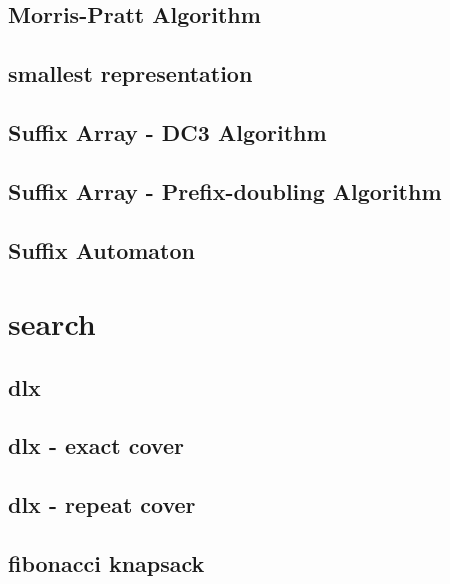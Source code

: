 \documentclass[a4paper,5pt,twocolumn,titlepage]{article}
\begin{document}
\subsection{Morris-Pratt Algorithm}

\subsection{smallest representation}

\subsection{Suffix Array - DC3 Algorithm}

\subsection{Suffix Array - Prefix-doubling Algorithm}

\subsection{Suffix Automaton}


\section{search}
\subsection{dlx}

\subsection{dlx - exact cover}

\subsection{dlx - repeat cover}

\subsection{fibonacci knapsack}

\end{document}
